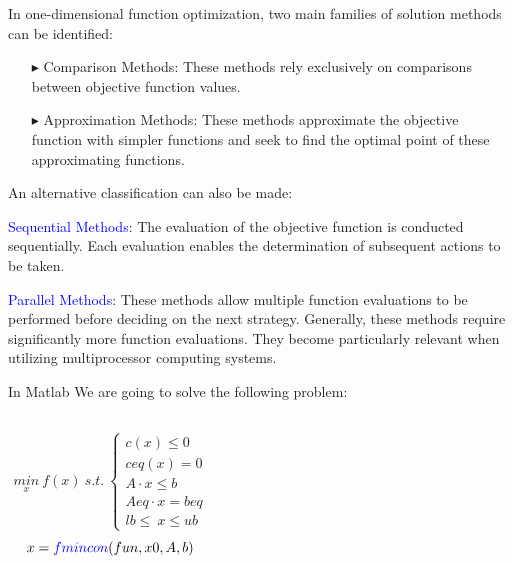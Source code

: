 \documentclass[xcolor={dvipsnames,rgb}, aspectratio=169]{beamer}
\begin{document}
\begin{frame}
   \small{
      In one-dimensional function optimization, two main families of solution methods can be
      identified:

      \begin{itemize}
         \item[$\blacktriangleright$] \alert{Comparison Methods}: These methods rely
            exclusively on comparisons between objective function values.
         \item[$\blacktriangleright$] \alert{Approximation Methods}: These methods
            approximate the objective function with simpler functions and seek to find the
            optimal point of these approximating functions.
      \end{itemize}

      An alternative classification can also be made:

      \textcolor{blue}{Sequential Methods}: The evaluation of the objective function is
      conducted sequentially. Each evaluation enables the determination of subsequent
      actions to be taken.

      \textcolor{blue}{Parallel Methods}: These methods allow multiple function evaluations
      to be performed before deciding on the next strategy. Generally, these methods require
      significantly more function evaluations. They become particularly relevant when
      utilizing multiprocessor computing systems.
   }
\end{frame}

\begin{frame}{In Matlab}
   We are going to solve the following problem:
   \begin{columns}
      \begin{align*}
         \underset{x}{min} \: f(x) \: s.t. \:
         \begin{cases}
            c(x) \leq 0 \\
            ceq(x) = 0 \\
            A \cdot x \leq b \\
            Aeq \cdot x = beq \\
            lb \leq \: x \leq ub
         \end{cases}
      \end{align*}
      \begin{equation*}
         x = \textcolor{blue}{fmincon}(fun,x0,A,b)
      \end{equation*}
   \end{columns}
\end{frame}
\end{document}
